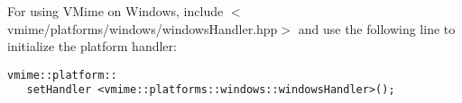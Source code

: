 For using VMime on Windows, include
$<$vmime/platforms/windows/windowsHandler.hpp$>$ and use the following line
to initialize the platform handler:

\begin{lstlisting}
vmime::platform::
   setHandler <vmime::platforms::windows::windowsHandler>();
\end{lstlisting}


